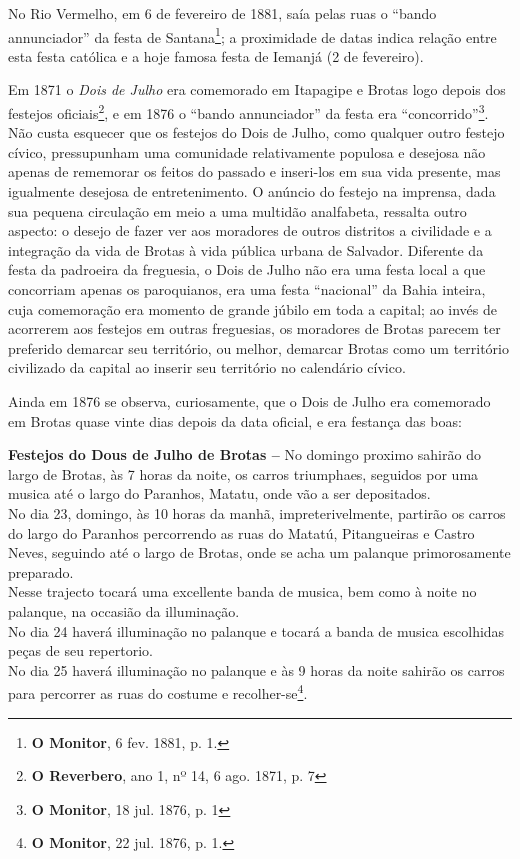 No Rio Vermelho, em 6 de fevereiro de 1881, saía pelas ruas o ``bando annunciador'' da festa de Santana\footnote{\textbf{O Monitor}, 6 fev. 1881, p. 1.}; a proximidade de datas indica relação entre esta festa católica e a hoje famosa festa de Iemanjá (2 de fevereiro).

Em 1871 o \textit{Dois de Julho} era comemorado em Itapagipe e Brotas logo depois dos festejos oficiais\footnote{\textbf{O Reverbero}, ano 1, nº 14, 6 ago. 1871, p. 7}, e em 1876 o ``bando annunciador'' da festa era ``concorrido''\footnote{\textbf{O Monitor}, 18 jul. 1876, p. 1}. Não custa esquecer que os festejos do Dois de Julho, como qualquer outro festejo cívico, pressupunham uma comunidade relativamente populosa e desejosa não apenas de rememorar os feitos do passado e inseri-los em sua vida presente, mas igualmente desejosa de entretenimento. O anúncio do festejo na imprensa, dada sua pequena circulação em meio a uma multidão analfabeta, ressalta outro aspecto: o desejo de fazer ver aos moradores de outros distritos a civilidade e a integração da vida de Brotas à vida pública urbana de Salvador. Diferente da festa da padroeira da freguesia, o Dois de Julho não era uma festa local a que concorriam apenas os paroquianos, era uma festa ``nacional'' da Bahia inteira, cuja comemoração era momento de grande júbilo em toda a capital; ao invés de acorrerem aos festejos em outras freguesias, os moradores de Brotas parecem ter preferido demarcar seu território, ou melhor, demarcar Brotas como um território civilizado da capital ao inserir seu território no calendário cívico.

Ainda em 1876 se observa, curiosamente, que o Dois de Julho era comemorado em Brotas quase vinte dias depois da data oficial, e era festança das boas:

\begin{citacao}
\textbf{Festejos do Dous de Julho de Brotas --} No domingo proximo sahirão do largo de Brotas, às 7 horas da noite, os carros triumphaes, seguidos por uma musica até o largo do Paranhos, Matatu, onde vão a ser depositados. \\
No dia 23, domingo, às 10 horas da manhã, impreterivelmente, partirão os carros do largo do Paranhos percorrendo as ruas do Matatú, Pitangueiras e Castro Neves, seguindo até o largo de Brotas, onde se acha um palanque primorosamente preparado. \\
Nesse trajecto tocará uma excellente banda de musica, bem como à noite no palanque, na occasião da illuminação. \\
No dia 24 haverá illuminação no palanque e tocará a banda de musica escolhidas peças de seu repertorio. \\
No dia 25 haverá illuminação no palanque e às 9 horas da noite sahirão os carros para percorrer as ruas do costume e recolher-se\footnote{\textbf{O Monitor}, 22 jul. 1876, p. 1.}.
\end{citacao}

